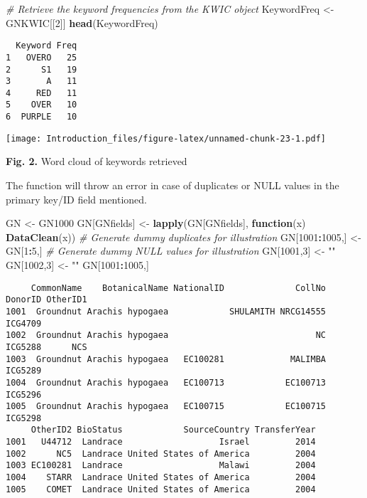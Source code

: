 \documentclass[
]{article}
\newenvironment{Shaded}{\begin{snugshade}}{\end{snugshade}}
\newcommand{\CommentTok}[1]{\textcolor[rgb]{0.56,0.35,0.01}{\textit{#1}}}
\newcommand{\ControlFlowTok}[1]{\textcolor[rgb]{0.13,0.29,0.53}{\textbf{#1}}}
\newcommand{\DecValTok}[1]{\textcolor[rgb]{0.00,0.00,0.81}{#1}}
\newcommand{\KeywordTok}[1]{\textcolor[rgb]{0.13,0.29,0.53}{\textbf{#1}}}
\newcommand{\NormalTok}[1]{#1}
\newcommand{\OperatorTok}[1]{\textcolor[rgb]{0.81,0.36,0.00}{\textbf{#1}}}
\newcommand{\StringTok}[1]{\textcolor[rgb]{0.31,0.60,0.02}{#1}}
\begin{document}
\begin{Shaded}
\begin{Highlighting}[]
\CommentTok{# Retrieve the keyword frequencies from the KWIC object}
\NormalTok{KeywordFreq <-}\StringTok{ }\NormalTok{GNKWIC[[}\DecValTok{2}\NormalTok{]]}
\KeywordTok{head}\NormalTok{(KeywordFreq)}
\end{Highlighting}
\end{Shaded}

\begin{verbatim}
  Keyword Freq
1   OVERO   25
2      S1   19
3       A   11
4     RED   11
5    OVER   10
6  PURPLE   10
\end{verbatim}

\texttt{[image: Introduction\_files/figure-latex/unnamed-chunk-23-1.pdf]}

\textbf{Fig. 2.} Word cloud of keywords retrieved

The function will throw an error in case of duplicates or NULL values in
the primary key/ID field mentioned.

\begin{Shaded}
\begin{Highlighting}[]
\NormalTok{GN <-}\StringTok{ }\NormalTok{GN1000}
\NormalTok{GN[GNfields] <-}\StringTok{ }\KeywordTok{lapply}\NormalTok{(GN[GNfields], }\ControlFlowTok{function}\NormalTok{(x) }\KeywordTok{DataClean}\NormalTok{(x))}
\CommentTok{# Generate dummy duplicates for illustration}
\NormalTok{GN[}\DecValTok{1001}\OperatorTok{:}\DecValTok{1005}\NormalTok{,] <-}\StringTok{ }\NormalTok{GN[}\DecValTok{1}\OperatorTok{:}\DecValTok{5}\NormalTok{,]}
\CommentTok{# Generate dummy NULL values for illustration}
\NormalTok{GN[}\DecValTok{1001}\NormalTok{,}\DecValTok{3}\NormalTok{] <-}\StringTok{ ""}
\NormalTok{GN[}\DecValTok{1002}\NormalTok{,}\DecValTok{3}\NormalTok{] <-}\StringTok{ ""}
\NormalTok{GN[}\DecValTok{1001}\OperatorTok{:}\DecValTok{1005}\NormalTok{,]}
\end{Highlighting}
\end{Shaded}

\begin{verbatim}
     CommonName    BotanicalName NationalID              CollNo DonorID OtherID1
1001  Groundnut Arachis hypogaea            SHULAMITH NRCG14555 ICG4709         
1002  Groundnut Arachis hypogaea                             NC ICG5288      NCS
1003  Groundnut Arachis hypogaea   EC100281             MALIMBA ICG5289         
1004  Groundnut Arachis hypogaea   EC100713            EC100713 ICG5296         
1005  Groundnut Arachis hypogaea   EC100715            EC100715 ICG5298         
     OtherID2 BioStatus            SourceCountry TransferYear
1001   U44712  Landrace                   Israel         2014
1002      NC5  Landrace United States of America         2004
1003 EC100281  Landrace                   Malawi         2004
1004    STARR  Landrace United States of America         2004
1005    COMET  Landrace United States of America         2004
\end{verbatim}
\end{document}
